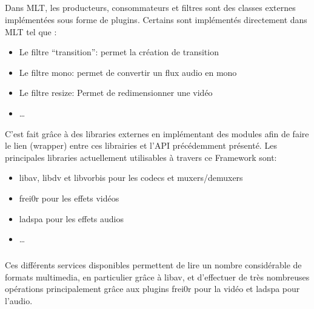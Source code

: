 \subparagraph{}

Dans MLT, les producteurs, consommateurs et filtres sont des
classes externes implémentées sous forme de plugins. Certains sont
implémentés directement dans MLT tel que :

\begin{itemize}

  \item {Le filtre ``transition'': permet la création de transition}

  \item {Le filtre mono: permet de convertir un flux audio en mono}

  \item {Le filtre resize: Permet de redimensionner une vidéo}

  \item {\ldots}

\end{itemize}

C'est fait grâce à des libraries externes en implémentant des
modules afin de faire le lien (wrapper)  entre ces librairies
et l'API précédemment présenté. Les principales libraries
actuellement utilisables à travers ce Framework sont:

\begin{itemize}

  \item {libav, libdv et libvorbis pour les codecs et muxers/demuxers}

  \item {frei0r pour les effets vidéos}

  \item {ladspa pour les effets audios}

  \item {\ldots}

\end{itemize}

\subparagraph{}

Ces différents services disponibles permettent de lire un nombre
considérable de formats multimedia, en particulier grâce à libav,
et d'effectuer de très nombreuses opérations principalement grâce
aux plugins frei0r pour la vidéo et ladspa pour l'audio.

